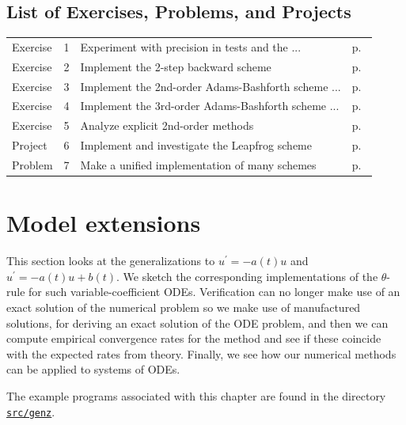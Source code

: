 \documentclass[%
oneside,                 %
final,                   %
10pt]{article}
\begin{document}
\subsection*{List of Exercises, Problems, and Projects}
\begin{tabular}{lrll}
Exercise & 1 & Experiment with precision in tests and the ... & p.~\pageref{decay:fd2:exer:precision} \\
Exercise & 2 & Implement the 2-step backward scheme & p.~\pageref{decay:fd2:exer:bw2} \\
Exercise & 3 & Implement the 2nd-order Adams-Bashforth scheme ... & p.~\pageref{decay:fd2:exer:AB2} \\
Exercise & 4 & Implement the 3rd-order Adams-Bashforth scheme ... & p.~\pageref{decay:fd2:exer:AB3} \\
Exercise & 5 & Analyze explicit 2nd-order methods & p.~\pageref{decay:exer:RK2:Taylor:analysis} \\
Project & 6 & Implement and investigate the Leapfrog scheme & p.~\pageref{decay:fd2:exer:leapfrog1} \\
Problem & 7 & Make a unified implementation of many schemes & p.~\pageref{decay:fd2:exer:uni} \\
\end{tabular}
\clearpage %




\vspace{1cm} %







\section{Model extensions}

This section looks at the generalizations to $u^{\prime}=-a(t)u$
and $u^{\prime}=-a(t)u + b(t)$. We sketch the corresponding
implementations of the $\theta$-rule for such variable-coefficient ODEs.
Verification can no longer make use of an exact solution of the
numerical problem so we make use of manufactured solutions,
for deriving an exact solution of the ODE problem, and then we can
compute empirical convergence rates for the method and see if these
coincide with the expected rates from theory.
Finally, we see how our numerical methods can be applied to systems
of ODEs.

The example programs associated with this chapter are found in
the directory \href{{http://tinyurl.com/ofkw6kc/genz}}{\nolinkurl{src/genz}}.
\end{document}
